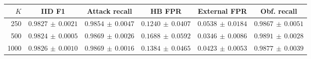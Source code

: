 \begin{tabular}{@{}rccccc@{}}
\toprule
$K$ & IID F1 & Attack recall & HB FPR & External FPR & Obf. recall \\
\midrule
250 & $0.9827\,\pm\,0.0021$ & $0.9854\,\pm\,0.0047$ & $0.1240\,\pm\,0.0407$ & $0.0538\,\pm\,0.0184$ & $0.9867\,\pm\,0.0051$ \\
500 & $0.9824\,\pm\,0.0005$ & $0.9869\,\pm\,0.0026$ & $0.1688\,\pm\,0.0592$ & $0.0346\,\pm\,0.0086$ & $0.9891\,\pm\,0.0028$ \\
1000 & $0.9826\,\pm\,0.0010$ & $0.9869\,\pm\,0.0016$ & $0.1384\,\pm\,0.0465$ & $0.0423\,\pm\,0.0053$ & $0.9877\,\pm\,0.0039$ \\
\bottomrule
\end{tabular}
